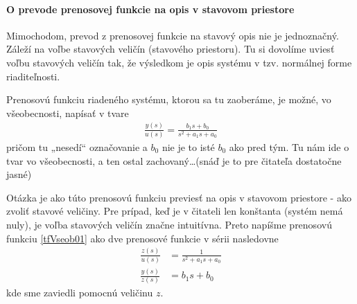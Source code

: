 \documentclass[a4paper, 10pt, ]{article}
\begin{document}
\paragraph{O prevode prenosovej funkcie na opis v stavovom priestore}

Mimochodom, prevod z prenosovej funkcie na stavový opis nie je jednoznačný. Záleží na voľbe stavových veličín (stavového priestoru). Tu si dovolíme uviesť voľbu stavových veličín tak, že výsledkom je opis systému v tzv. normálnej forme riaditeľnosti.


Prenosovú funkciu riadeného systému, ktorou sa tu zaoberáme, je možné, vo všeobecnosti, napísať v tvare
\begin{align} \label{tfVseob01}
	\frac{y(s)}{u(s)} = \frac{b_1 s + b_0}{ s^2 + a_1 s + a_0}
\end{align}
pričom tu „nesedí“ označovanie a $b_0$ nie je to isté $b_0$ ako pred tým. Tu nám ide o tvar vo všeobecnosti, a ten ostal zachovaný\ldots (snáď je to pre čitateľa dostatočne jasné)

Otázka je ako túto prenosovú funkciu previesť na opis v stavovom priestore - ako zvoliť stavové veličiny. Pre prípad, keď je v čitateli len konštanta (systém nemá nuly), je voľba stavových veličín značne intuitívna. Preto napíšme prenosovú funkciu \eqref{tfVseob01} ako dve prenosové funkcie v sérii nasledovne
\begin{align}
	\frac{z(s)}{u(s)} &= \frac{1}{ s^2 + a_1 s + a_0} \label{tfVseob02a} \\
    \frac{y(s)}{z(s)} &= b_1 s + b_0 \label{tfVseob02b}
\end{align}
kde sme zaviedli pomocnú veličinu $z$.
\end{document}
